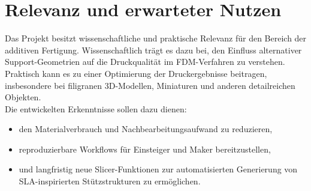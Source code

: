 \chapter{Relevanz und erwarteter Nutzen}
\label{cha:Relevanz und erwarteter Nutzen}

Das Projekt besitzt wissenschaftliche und praktische Relevanz für den Bereich der additiven Fertigung.  
Wissenschaftlich trägt es dazu bei, den Einfluss alternativer Support-Geometrien auf die Druckqualität im FDM-Verfahren zu verstehen.  
Praktisch kann es zu einer Optimierung der Druckergebnisse beitragen, insbesondere bei filigranen 3D-Modellen, Miniaturen und anderen detailreichen Objekten.\\

Die entwickelten Erkenntnisse sollen dazu dienen:
\begin{itemize}
  \item den Materialverbrauch und Nachbearbeitungsaufwand zu reduzieren,
  \item reproduzierbare Workflows für Einsteiger und Maker bereitzustellen,
  \item und langfristig neue Slicer-Funktionen zur automatisierten Generierung von SLA-inspirierten Stützstrukturen zu ermöglichen.
\end{itemize}
